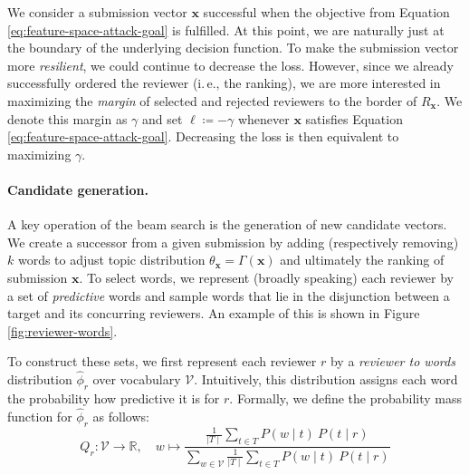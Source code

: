 \documentclass[letterpaper,twocolumn,10pt]{article}
\newcommand{\ie}{i.\,e.}
\newcommand{\bow}{\textbf{x}}
\newcommand{\vocabulary}{\mathcal{V}}
\newcommand{\submission}{\bow}
\newcommand{\reviewersubset}{R}
\newcommand{\reviewer}{r}
\newcommand{\reviewerwordsmass}{Q}
\newcommand{\reviewerwords}{\hat{\topicworddist}}
\newcommand{\topic}{t}
\newcommand{\topics}{T}
\newcommand{\stepsize}{k}
\newcommand{\loss}{\ell}
\newcommand{\topicextractor}{\Gamma}
\newcommand{\topicworddist}{\phi}
\newcommand{\topicdocumentdist}{\theta}
\newcommand{\word}{w}
\newcommand{\prob}{P}
\newcommand{\margin}{\gamma}
\begin{document}
We consider a submission vector $\submission$ successful when the objective from Equation \ref{eq:feature-space-attack-goal} is fulfilled. At this point, we are naturally just at the boundary of the underlying decision function. To make the submission vector more \emph{resilient}, we could continue to decrease the loss. However, since we already successfully ordered the reviewer (\ie{}, the ranking), we are more interested in maximizing the \emph{margin} of selected and rejected reviewers to the {border\EndAccSupp{}} of $\reviewersubset_\submission$. We denote this margin as $\margin$ and set $\loss \coloneqq -\margin$ whenever $\submission$ satisfies Equation \ref{eq:feature-space-attack-goal}. Decreasing the loss is then equivalent to maximizing $\margin$. 

\paragraph{Candidate generation.}

A key operation of the beam search is the generation of new candidate vectors. We create a successor from a given submission by adding (respectively removing) $\stepsize$ words to adjust topic distribution $\topicdocumentdist_\submission = \topicextractor(\submission)$ and ultimately the ranking of submission $\submission$.
To select words, we represent (broadly speaking) each reviewer by a set of \emph{predictive} words and sample words that lie in the disjunction between a target and its concurring reviewers. An example of this is shown in Figure \ref{fig:reviewer-words}.

To construct these sets, we first represent each reviewer $\reviewer$ by a  \emph{reviewer to words} distribution $\reviewerwords_\reviewer$ over vocabulary $\vocabulary$. 
Intuitively, this distribution assigns each word the probability how predictive it is for $\reviewer$. Formally, we define the probability {mass\EndAccSupp{}} function for $\reviewerwords_\reviewer$ as follows:
\begin{equation*}
\label{eq:reviewerwords}
   \reviewerwordsmass_\reviewer \colon \vocabulary \rightarrow \mathbb{R}, \quad 
   \word \mapsto 
   \frac
   {\frac{1}{\mid\topics\mid} \sum_{\topic \in \topics}{\prob(\word \mid \topic)\ \prob(\topic \mid \reviewer)}}
   {\sum_{\word\in\vocabulary}{\frac{1}{\mid\topics\mid} \sum_{\topic \in \topics}{\prob(\word \mid \topic)\ \prob(\topic \mid \reviewer)}}}
\end{equation*}
\end{document}
